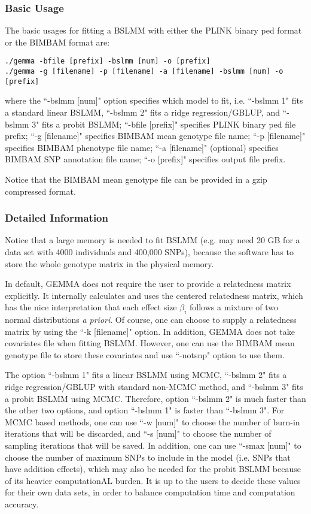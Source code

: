\documentclass[11pt]{article}
\begin{document}
\subsubsection{Basic Usage}

The basic usages for fitting a BSLMM with either the PLINK binary ped
format or the BIMBAM format are:

\begin{verbatim}
./gemma -bfile [prefix] -bslmm [num] -o [prefix]
./gemma -g [filename] -p [filename] -a [filename] -bslmm [num] -o [prefix]
\end{verbatim}

where the ``-bslmm [num]" option specifies which model to fit,
i.e. ``-bslmm 1" fits a standard linear BSLMM, ``-bslmm 2" fits a
ridge regression/GBLUP, and ``-bslmm 3" fits a probit BSLMM; ``-bfile
[prefix]" specifies PLINK binary ped file prefix; ``-g [filename]"
specifies BIMBAM mean genotype file name; ``-p [filename]" specifies
BIMBAM phenotype file name; ``-a [filename]" (optional) specifies
BIMBAM SNP annotation file name; ``-o [prefix]" specifies output file
prefix.

Notice that the BIMBAM mean genotype file can be provided in a gzip
compressed format.

\subsubsection{Detailed Information}

Notice that a large memory is needed to fit BSLMM (e.g. may need 20 GB
for a data set with 4000 individuals and 400,000 SNPs), because the
software has to store the whole genotype matrix in the physical
memory.

In default, GEMMA does not require the user to provide a relatedness
matrix explicitly. It internally calculates and uses the centered
relatedness matrix, which has the nice interpretation that each effect
size $\beta_i$ follows a mixture of two normal distributions {\it a
  priori}. Of course, one can choose to supply a relatedness matrix by
using the ``-k [filename]" option. In addition, GEMMA does not take
covariates file when fitting BSLMM. However, one can use the BIMBAM
mean genotype file to store these covariates and use ``-notsnp" option
to use them.

The option ``-bslmm 1" fits a linear BSLMM using MCMC, ``-bslmm 2"
fits a ridge regression/GBLUP with standard non-MCMC method, and
``-bslmm 3" fits a probit BSLMM using MCMC. Therefore, option ``-bslmm
2" is much faster than the other two options, and option ``-bslmm 1"
is faster than ``-bslmm 3". For MCMC based methods, one can use ``-w
[num]" to choose the number of burn-in iterations that will be
discarded, and ``-s [num]" to choose the number of sampling iterations
that will be saved. In addition, one can use ``-smax [num]" to choose
the number of maximum SNPs to include in the model (i.e. SNPs that
have addition effects), which may also be needed for the probit BSLMM
because of its heavier computationAL burden. It is up to the users to
decide these values for their own data sets, in order to balance
computation time and computation accuracy.
\end{document}
